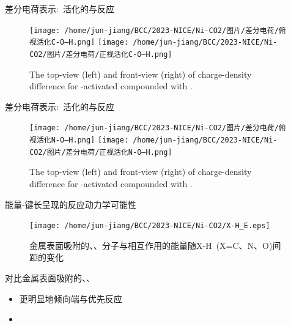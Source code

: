 \begin{frame}[allowframebreaks]
差分电荷表示:~活化的\textrm{}与\textrm{}反应
\begin{figure}[h!]
\centering
\texttt{[image: /home/jun-jiang/BCC/2023-NICE/Ni-CO2/图片/差分电荷/俯视活化C-O---H.png]}
\texttt{[image: /home/jun-jiang/BCC/2023-NICE/Ni-CO2/图片/差分电荷/正视活化C-O---H.png]}
\caption{\tiny \textrm{The top-view (left) and front-view (right) of charge-density difference for -activated compounded with .}}%
\label{Charge-density_difference:CO}
\end{figure}
差分电荷表示:~活化的\textrm{}与\textrm{}反应
\begin{figure}[h!]
\centering
\texttt{[image: /home/jun-jiang/BCC/2023-NICE/Ni-CO2/图片/差分电荷/俯视活化N-O---H.png]}
\texttt{[image: /home/jun-jiang/BCC/2023-NICE/Ni-CO2/图片/差分电荷/正视活化N-O---H.png]}
\caption{\tiny \textrm{The top-view (left) and front-view (right) of charge-density difference for -activated compounded with .}}%
\label{Charge-density_difference:NO}
\end{figure}
能量-键长呈现的反应动力学可能性
\begin{figure}[h!]
\centering
\texttt{[image: /home/jun-jiang/BCC/2023-NICE/Ni-CO2/X-H\_E.eps]}
\caption{\tiny 金属表面吸附的\textrm{、、}分子与\textrm{}相互作用的能量随\textrm{X-H~(X=C、N、O)}间距的变化}%
\label{X-H_E}
\end{figure}
\newpage
对比金属表面吸附的\textrm{}、\textrm{}、\textrm{}
\begin{itemize}
	\item \textrm{}更明显地倾向\textrm{}端与\textrm{}优先反应
	\item \textrm{}
\end{itemize}

\end{frame}

